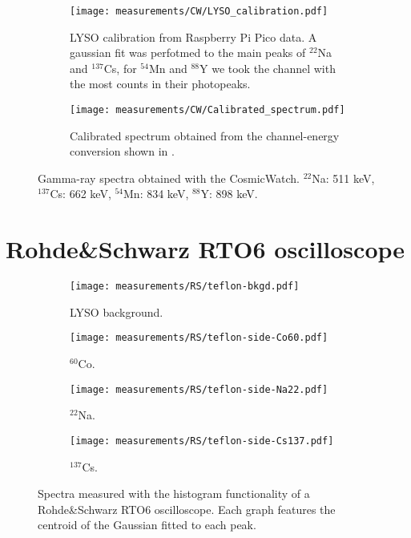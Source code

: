 \begin{figure}[H]
  \begin{subfigure}[t]{\textwidth}
    \centering
    \texttt{[image: measurements/CW/LYSO\_calibration.pdf]}
    \caption{\label{sfig:CW_LYSO_calibration}LYSO calibration from Raspberry Pi Pico data. A gaussian fit was perfotmed to the main peaks of $^{22}$Na and $^{137}$Cs, for $^{54}$Mn and $^{88}$Y we took the channel with the most counts in their photopeaks.}
  \end{subfigure}
  \medskip
  \begin{subfigure}[t]{\textwidth}
    \centering
    \texttt{[image: measurements/CW/Calibrated\_spectrum.pdf]}
    \caption{\label{sfig:CW_joint_spectra}Calibrated spectrum obtained from the channel-energy conversion shown in .}
  \end{subfigure}
  \caption{\label{fig:CW_calibration}Gamma-ray spectra obtained with the CosmicWatch. $^{22}$Na: 511 keV, $^{137}$Cs: 662 keV, $^{54}$Mn: 834 keV, $^{88}$Y: 898 keV.}
\end{figure}

\section{Rohde\&Schwarz RTO6 oscilloscope}\label{sec:RTO6}

\begin{figure}[H]
  \begin{subfigure}[t]{0.48\textwidth}
    \centering
    \texttt{[image: measurements/RS/teflon-bkgd.pdf]}
    \caption{\label{sfig:RS_bkgd}LYSO background.}
  \end{subfigure}
  \hfill
  \begin{subfigure}[t]{0.48\textwidth}
    \centering
    \texttt{[image: measurements/RS/teflon-side-Co60.pdf]}
    \caption{\label{sfig:RS_60Co}$^{60}$Co.}
  \end{subfigure}
  \medskip
  \begin{subfigure}[t]{0.48\textwidth}
    \centering
    \texttt{[image: measurements/RS/teflon-side-Na22.pdf]}
    \caption{\label{sfig:RS_22Na}$^{22}$Na.}
  \end{subfigure}
  \hfill
  \begin{subfigure}[t]{0.48\textwidth}
    \centering
    \texttt{[image: measurements/RS/teflon-side-Cs137.pdf]}
    \caption{\label{sfig:RS_137Cs}$^{137}$Cs.}
  \end{subfigure}
  \caption{\label{fig:RS_spectra}Spectra measured with the histogram functionality of a Rohde\&Schwarz RTO6 oscilloscope. Each graph features the centroid of the Gaussian fitted to each peak.}
\end{figure}

